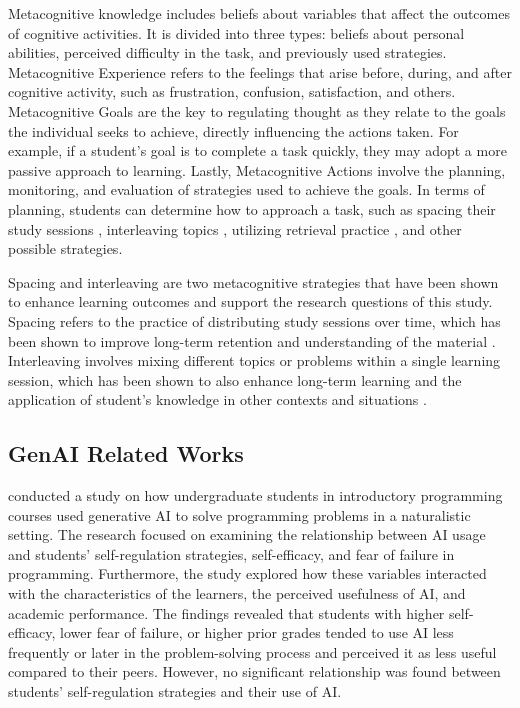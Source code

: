 \documentclass[a4paper,twoside]{article}
\begin{document}
Metacognitive knowledge includes beliefs about variables that affect the
outcomes of cognitive activities. It is divided into three types: beliefs about
personal abilities, perceived difficulty in the task, and previously used
strategies. Metacognitive Experience refers to the feelings that arise before,
during, and after cognitive activity, such as frustration, confusion,
satisfaction, and others. Metacognitive Goals are the key to regulating thought
as they relate to the goals the individual seeks to achieve, directly
influencing the actions taken. For example, if a student’s goal is to complete
a task quickly, they may adopt a more passive approach to learning. Lastly,
Metacognitive Actions involve the planning, monitoring, and evaluation of
strategies used to achieve the goals. In terms of planning, students can
determine how to approach a task, such as spacing their study sessions
\citep{Ouhao18, Carvalho20}, interleaving topics \citep{Rivers21}, utilizing
retrieval practice \citep{larsen18}, and other possible strategies.

Spacing and interleaving are two metacognitive strategies that have been shown
to enhance learning outcomes and support the research questions of this study.
Spacing refers to the practice of distributing study sessions over time, which
has been shown to improve long-term retention and understanding of the material
\citep{Carvalho20}. Interleaving involves mixing different topics or problems
within a single learning session, which has been shown to also enhance long-term
learning and the application of student's knowledge in other contexts and
situations \citep{rohrer20} \citep{Rivers21} .

\subsection{GenAI Related Works}

\cite{Margulieux24} conducted a study on how undergraduate students in
introductory programming courses used generative AI to solve programming
problems in a naturalistic setting. The research focused on examining the
relationship between AI usage and students’ self-regulation strategies,
self-efficacy, and fear of failure in programming. Furthermore, the study
explored how these variables interacted with the characteristics of the learners,
the perceived usefulness of AI, and academic performance. The findings revealed
that students with higher self-efficacy, lower fear of failure, or higher prior
grades tended to use AI less frequently or later in the problem-solving process
and perceived it as less useful compared to their peers. However, no significant
relationship was found between students’ self-regulation strategies and their
use of AI.
\end{document}
